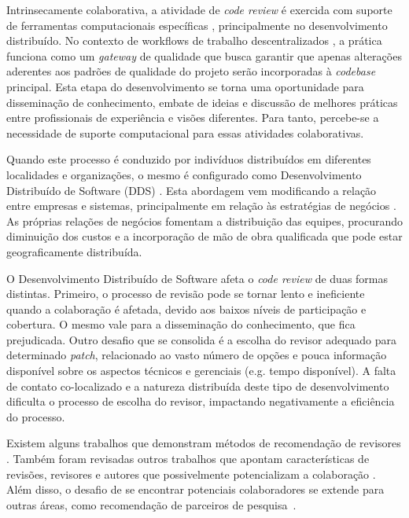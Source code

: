 \documentclass[sigconf]{acmart}
\begin{document}
Intrinsecamente colaborativa, a atividade de \textit{code review} é exercida com suporte de ferramentas computacionais específicas \cite{Bacchelli2013}, principalmente no desenvolvimento distribuído. No contexto de workflows de trabalho descentralizados \cite{gousios2016}, a prática funciona como um \textit{gateway} de qualidade que busca garantir que apenas alterações aderentes aos padrões de qualidade do projeto serão incorporadas à \textit{codebase} principal. Esta etapa do desenvolvimento se torna uma oportunidade para disseminação de conhecimento, embate de ideias e discussão de melhores práticas entre profissionais de experiência e visões diferentes. Para tanto, percebe-se a necessidade de suporte computacional para essas atividades colaborativas.

Quando este processo é conduzido por indivíduos distribuídos em diferentes localidades e organizações, o mesmo é configurado como Desenvolvimento Distribuído de Software (DDS) \cite{herbsleb2003}. Esta abordagem vem modificando a relação entre empresas e sistemas, principalmente em relação às estratégias de negócios \cite{audy2007}. As próprias relações de negócios fomentam a distribuição das equipes, procurando diminuição dos custos e a incorporação de mão de obra qualificada que pode estar geograficamente distribuída.

O Desenvolvimento Distribuído de Software afeta o \textit{code review} de duas formas distintas. Primeiro, o processo de revisão pode se tornar lento e ineficiente quando a colaboração é afetada, devido aos baixos níveis de participação e cobertura. O mesmo vale para a disseminação do conhecimento, que fica prejudicada. Outro desafio que se consolida é a escolha do revisor adequado para determinado \textit{patch}, relacionado ao vasto número de opções e pouca informação disponível sobre os aspectos técnicos e gerenciais (e.g. tempo disponível). A falta de contato co-localizado e a natureza distribuída deste tipo de desenvolvimento dificulta o processo de escolha do revisor, impactando negativamente a eficiência do processo.

Existem alguns trabalhos que demonstram métodos de recomendação de revisores \cite{yu2014,Xia2015261,jiang2017}. Também foram revisadas outros trabalhos que apontam características de revisões, revisores e autores que possivelmente potencializam a colaboração \cite{Kemerer2009,Bird2015191,Baysal2013122}. Além disso, o desafio de se encontrar potenciais colaboradores se extende para outras áreas, como recomendação de parceiros de pesquisa~\cite{digiampietri2015}.
\end{document}
